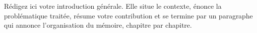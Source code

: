 \chapter*{\introductionname}
{}
\markboth{\introductionname}{\introductionname}
\thispagestyle{plain}

Rédigez ici votre introduction générale. Elle situe le contexte, énonce la
problématique traitée, résume votre contribution et se termine par un
paragraphe qui annonce l'organisation du mémoire, chapitre par chapitre.

\newpage

